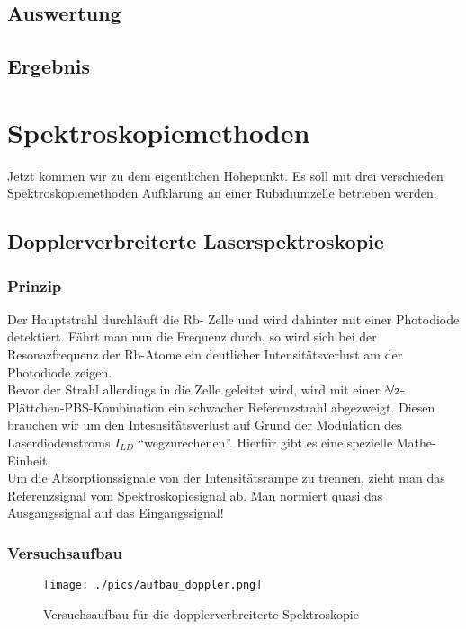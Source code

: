 \documentclass[a4paper,oneside]{article}
\begin{document}
\subsection{Auswertung}
\subsection{Ergebnis}


\section{Spektroskopiemethoden}
Jetzt kommen wir zu dem eigentlichen Höhepunkt. Es soll mit drei verschieden Spektroskopiemethoden Aufklärung an einer Rubidiumzelle betrieben werden.
\subsection{Dopplerverbreiterte Laserspektroskopie}
\subsubsection{Prinzip}
Der Hauptstrahl durchläuft die Rb- Zelle und wird dahinter mit einer Photodiode detektiert. Fährt man nun die Frequenz durch, so wird sich bei der Resonazfrequenz der Rb-Atome ein deutlicher Intensitätsverlust am der Photodiode zeigen.\\
Bevor der Strahl allerdings in die Zelle geleitet wird, wird mit einer $\nicefrac{\lambda}{2}$-Plättchen-PBS-Kombination ein schwacher Referenzstrahl abgezweigt. Diesen brauchen wir um den Intesnsitätsverlust auf Grund der Modulation des Laserdiodenstroms $I_{LD}$ ``wegzurechenen''. Hierfür gibt es eine spezielle Mathe- Einheit.\\
Um die Absorptionssignale von der Intensitätsrampe zu trennen, zieht man das Referenzsignal vom Spektroskopiesignal ab. Man normiert quasi das Ausgangssignal auf das Eingangssignal!

\subsubsection{Versuchsaufbau}

\begin{figure}
 \centering
 \texttt{[image: ./pics/aufbau\_doppler.png]}
 \caption[dopplerverbreiterte Spektroskopie]{Versuchsaufbau für die dopplerverbreiterte Spektroskopie}
 \label{dopplerverbreiterte_Spektroskopie}
\end{figure}
\end{document}
